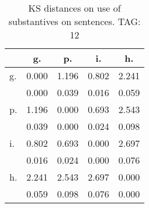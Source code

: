 \begin{table}[h!]
\begin{center}
\begin{tabular}{| l | c | c | c | c |}\hline
 & g. & p. & i. & h. \\\hline
g. & 0.000  & 1.196  & 0.802  & 2.241 \\\hline
 & 0.000  & 0.039  & 0.016  & 0.059 \\\hline
p. & 1.196  & 0.000  & 0.693  & 2.543 \\\hline
 & 0.039  & 0.000  & 0.024  & 0.098 \\\hline
i. & 0.802  & 0.693  & 0.000  & 2.697 \\\hline
 & 0.016  & 0.024  & 0.000  & 0.076 \\\hline
h. & 2.241  & 2.543  & 2.697  & 0.000 \\\hline
 & 0.059  & 0.098  & 0.076  & 0.000 \\\hline
\end{tabular}
\caption{KS distances on use of substantives on sentences. TAG: 12}
\end{center}
\end{table}